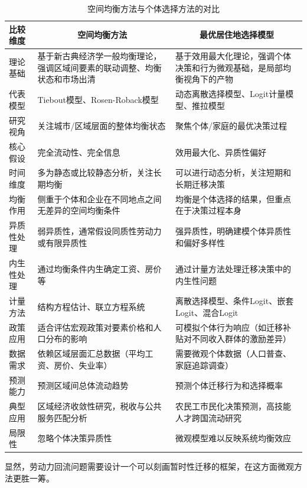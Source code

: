 \documentclass[a4paper, zihao=-4, fontset = mac, oneside]{ctexbook} %
\renewcommand{\arraystretch}{1.5}
\begin{document}
\begin{table}[!ht]
\centering
\caption{空间均衡方法与个体选择方法的对比}
\label{tab:空间均衡方法与个体选择方法的对比}
\begin{tabularx}{\textwidth}{@{}lXX@{}} 
\toprule
\textbf{比较维度} & \multicolumn{1}{c}{\textbf{空间均衡方法}} & \multicolumn{1}{c}{\textbf{最优居住地选择模型}} \\ \midrule
理论基础 & 基于新古典经济学一般均衡理论，强调区域间要素的联动调整、均衡状态和市场出清 & 基于效用最大化理论，强调个体决策和行为微观基础，是局部均衡视角下的产物 \\
代表模型 & Tiebout模型、Rosen-Roback模型 & 动态离散选择模型、Logit计量模型、推拉模型 \\
研究视角 & 关注城市/区域层面的整体均衡状态 & 聚焦个体/家庭的最优决策过程 \\
核心假设 & 完全流动性、完全信息 & 效用最大化、异质性偏好 \\
时间维度 & 多为静态或比较静态分析，关注长期均衡 & 可以进行动态分析，关注短期和长期迁移决策 \\
均衡作用 & 侧重于个体和企业在不同地点之间无差异的空间均衡条件 & 均衡是个体选择的结果，但重点在于决策过程本身 \\
异质性处理 & 弱异质性，通常假设同质性劳动力或有限异质性 & 强异质性，明确建模个体异质性和偏好多样性 \\
内生性处理 & 通过均衡条件内生确定工资、房价等 & 通过计量方法处理迁移决策中的内生性问题 \\
计量方法 & 结构方程估计、联立方程系统 & 离散选择模型、条件Logit、嵌套Logit、混合Logit \\
政策应用 & 适合评估宏观政策对要素价格和人口分布的影响 & 可模拟个体行为响应（如迁移补贴对不同收入群体的激励差异） \\
数据需求 & 依赖区域层面汇总数据（平均工资、房价、失业率） & 需要微观个体数据（人口普查、家庭追踪调查） \\
预测能力 & 预测区域间总体流动趋势 & 预测个体迁移行为和选择概率 \\
典型应用 & 区域经济收敛性研究，税收与公共服务匹配分析 & 农民工市民化决策预测，高技能人才跨国流动研究 \\
局限性 & 忽略个体决策异质性 & 微观模型难以反映系统均衡效应 \\ 
\bottomrule
\end{tabularx}
\end{table}


显然，劳动力回流问题需要设计一个可以刻画暂时性迁移的框架，在这方面微观方法更胜一筹。
\end{document}
